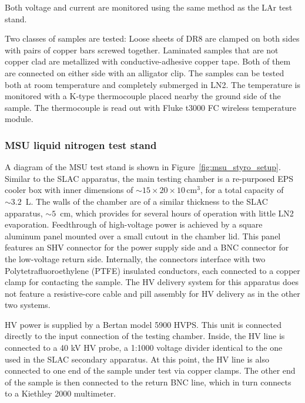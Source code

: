 \documentclass[a4paper,12pt]{article}
\begin{document}
Both voltage and current are monitored using the same method as the LAr test stand. 

Two classes of samples are tested: 
Loose sheets of DR8 are clamped on both sides with pairs of copper bars screwed together. 
Laminated samples that are not copper clad are metallized with conductive-adhesive copper tape. 
Both of them are connected on either side with an alligator clip. 
The samples can be tested both at room temperature and completely submerged in LN2. 
The temperature is monitored with a K-type thermocouple placed nearby the ground side of the sample. 
The thermocouple is read out with Fluke t3000 FC wireless temperature module.

\subsubsection{MSU liquid nitrogen test stand}
\label{sec:MSU}


A diagram of the MSU test stand is shown in Figure~\ref{fig:msu_styro_setup}.  Similar to the SLAC apparatus, the main testing chamber is a re-purposed EPS cooler box with inner dimensions of $\sim 15 \times 20 \times 10\,$cm$^3$, for a total capacity of $\sim 3.2\,$ L.  The walls of the chamber are of a similar thickness to the SLAC apparatus, $\sim 5\,$ cm, which provides for several hours of operation with little LN2 evaporation.  Feedthrough of high-voltage power is achieved by a square aluminum panel mounted over a small cutout in the chamber lid.  This panel features an SHV connector for the power supply side and a BNC connector for the low-voltage return side.  Internally, the connectors interface with two Polytetrafluoroethylene (PTFE) insulated conductors, each connected to a copper clamp for contacting the sample.  The HV delivery system for this apparatus does not feature a resistive-core cable and pill assembly for HV delivery as in the other two systems.

HV power is supplied by a Bertan model 5900 HVPS.  This unit is connected directly to the input connection of the testing chamber.  Inside, the HV line is connected to a 40 kV HV probe, a 1:1000 voltage divider identical to the one used in the SLAC secondary apparatus.  At this point, the HV line is also connected to one end of the sample under test via copper clamps.  The other end of the sample is then connected to the return BNC line, which in turn connects to a Kiethley 2000 multimeter.
\end{document}
